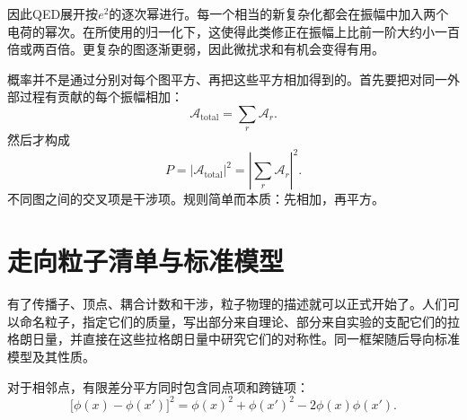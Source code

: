 因此QED展开按\(e^2\)的逐次幂进行。每一个相当的新复杂化都会在振幅中加入两个电荷的幂次。在所使用的归一化下，这使得此类修正在振幅上比前一阶大约小一百倍或两百倍。更复杂的图逐渐更弱，因此微扰求和有机会变得有用。

概率并不是通过分别对每个图平方、再把这些平方相加得到的。首先要把对同一外部过程有贡献的每个振幅相加：
\begin{equation}
\mathcal{A}_{\mathrm{total}}=\sum_r\mathcal{A}_r.
\end{equation}
然后才构成
\begin{equation}
P=\left|\mathcal{A}_{\mathrm{total}}\right|^2
=\left|\sum_r\mathcal{A}_r\right|^2.
\end{equation}
不同图之间的交叉项是干涉项。规则简单而本质：先相加，再平方。

\section{走向粒子清单与标准模型}

有了传播子、顶点、耦合计数和干涉，粒子物理的描述就可以正式开始了。人们可以命名粒子，指定它们的质量，写出部分来自理论、部分来自实验的支配它们的拉格朗日量，并直接在这些拉格朗日量中研究它们的对称性。同一框架随后导向标准模型及其性质。

\begin{classroomqa}
\end{classroomqa}

\begin{classroomqa}
\end{classroomqa}

对于相邻点，有限差分平方同时包含同点项和跨链项：
\begin{equation}
\bigl[\phi(x)-\phi(x')\bigr]^2
=
\phi(x)^2+\phi(x')^2-2\phi(x)\phi(x').
\end{equation}

\begin{classroomqa}
\end{classroomqa}
